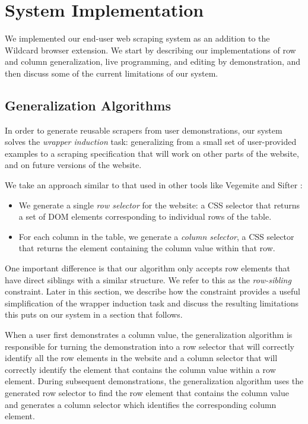 \documentclass[sigconf,10pt]{acmart}
\providecommand{\tightlist}{%
  \setlength{\itemsep}{0pt}\setlength{\parskip}{0pt}}
\begin{document}
\hypertarget{sec:implementation}{%
\section{System Implementation}\label{sec:implementation}}

We implemented our end-user web scraping system as an addition to the
Wildcard browser extension. We start by describing our implementations
of row and column generalization, live programming, and editing by
demonstration, and then discuss some of the current limitations of our
system.

\hypertarget{generalization-algorithms}{%
\subsection{Generalization Algorithms}\label{generalization-algorithms}}

In order to generate reusable scrapers from user demonstrations, our
system solves the \emph{wrapper induction} \citep{kushmerick2000} task:
generalizing from a small set of user-provided examples to a scraping
specification that will work on other parts of the website, and on
future versions of the website.

We take an approach similar to that used in other tools like Vegemite
\citep{lin2009} and Sifter \citep{huynh2006}:

\begin{itemize}
\tightlist
\item
  We generate a single \emph{row selector} for the website: a CSS
  selector that returns a set of DOM elements corresponding to
  individual rows of the table.
\item
  For each column in the table, we generate a \emph{column selector}, a
  CSS selector that returns the element containing the column value
  within that row.
\end{itemize}

One important difference is that our algorithm only accepts row elements
that have direct siblings with a similar structure. We refer to this as
the \emph{row-sibling} constraint. Later in this section, we describe
how the constraint provides a useful simplification of the wrapper
induction task and discuss the resulting limitations this puts on our
system in a section that follows.

When a user first demonstrates a column value, the generalization
algorithm is responsible for turning the demonstration into a row
selector that will correctly identify all the row elements in the
website and a column selector that will correctly identify the element
that contains the column value within a row element. During subsequent
demonstrations, the generalization algorithm uses the generated row
selector to find the row element that contains the column value and
generates a column selector which identifies the corresponding column
element.
\end{document}
